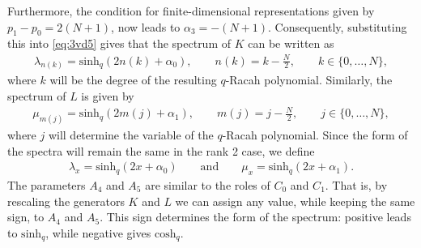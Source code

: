 \documentclass[10pt,a4paper]{amsart}
\numberwithin{equation}{section}
\newcommand{\chq}{\mathrm{cosh}_q}
\newcommand{\shq}{\mathrm{sinh}_q}
\begin{document}
Furthermore, the condition for finite-dimensional representations given by $p_1-p_0=2(N+1)$, now leads to $\alpha_3=-(N+1)$.
Consequently, substituting this into \eqref{eq:3vd5} gives that the spectrum of $K$ can be written as
\begin{gather}
	\lambda_{n(k)} = \shq(2n(k)+\alpha_0),\qquad n(k)=k-\frac{N}{2},\qquad k\in\{0,\dots,N\},\label{eq:nieuwspectrumK}
\end{gather}
where $k$ will be the degree of the resulting $q$-Racah polynomial. Similarly, the spectrum of $L$ is given by
\begin{gather}
	\mu_{m(j)} = \shq(2m(j)+\alpha_1),\qquad m(j)=j-\frac{N}{2},\qquad j\in\{0,\dots,N\},\label{eq:nieuwspectrumL}
\end{gather}
where $j$ will determine the variable of the $q$-Racah polynomial.
Since the form of the spectra will remain the same in the rank 2 case, we define
\begin{gather}
\lambda_x=\shq(2x+\alpha_0)\qquad\text{and}\qquad \mu_x=\shq(2x+\alpha_1).\label{eq:eigenvalues}
\end{gather}
The parameters $A_4$ and $A_5$ are similar to the roles of $C_0$ and $C_1$. That is, by rescaling the generators $K$ and $L$ we can assign any value, while keeping the same sign, to $A_4$ and $A_5$. This sign determines the form of the spectrum: positive leads to $\shq$, while negative gives $\chq$.
\end{document}
